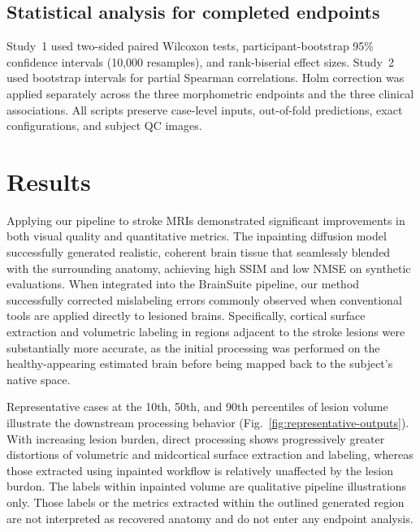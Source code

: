 \documentclass[runningheads]{llncs}
\begin{document}
\subsection{Statistical analysis for completed endpoints}
Study~1 used two-sided paired Wilcoxon tests, participant-bootstrap 95\%
confidence intervals (10,000 resamples), and rank-biserial effect sizes.
Study~2 used bootstrap intervals for partial Spearman correlations. Holm
correction was applied separately across the three morphometric endpoints and
the three clinical associations. All scripts preserve case-level inputs,
out-of-fold predictions, exact configurations, and subject QC images.





\section{Results}


Applying our pipeline to stroke MRIs demonstrated significant improvements in both visual quality and quantitative metrics. The inpainting diffusion model successfully generated realistic, coherent brain tissue that seamlessly blended with the surrounding anatomy, achieving high SSIM and low NMSE on synthetic evaluations. When integrated into the BrainSuite pipeline, our method successfully corrected mislabeling errors commonly observed when conventional tools are applied directly to lesioned brains. Specifically, cortical surface extraction and volumetric labeling in regions adjacent to the stroke lesions were substantially more accurate, as the initial processing was performed on the healthy-appearing estimated brain before being mapped back to the subject's native space.

Representative cases at the 10th, 50th, and 90th percentiles of lesion volume illustrate the downstream processing behavior (Fig.~\ref{fig:representative-outputs}). With increasing lesion burden, direct processing shows progressively greater distortions of volumetric and midcortical surface extraction and labeling, whereas those extracted using inpainted workflow is relatively unaffected by the lesion burdon. The labels within inpainted volume are qualitative pipeline illustrations only. Those labels or the metrics extracted within the outlined generated region are not interpreted as recovered anatomy and do not enter any endpoint analysis.
\end{document}

